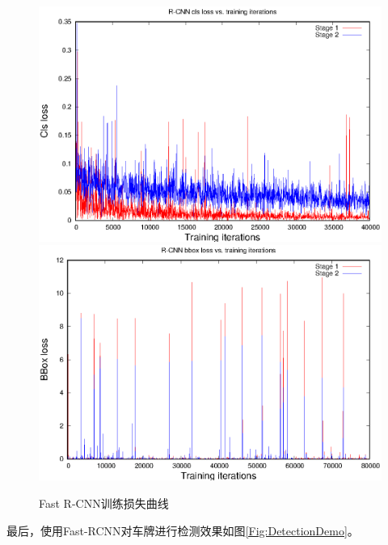 \begin{figure}[ht]
\centering
{}
{\includegraphics[width=0.8\linewidth]{./Figure/RCNNClsLoss.eps}}
{\includegraphics[width=0.8\linewidth]{./Figure/RCNNBBoxLoss.eps}}
\caption{Fast R-CNN训练损失曲线}\label{Fig:RCNNloss}
\end{figure}

最后，使用Fast-RCNN对车牌进行检测效果如图\ref{Fig:DetectionDemo}。

